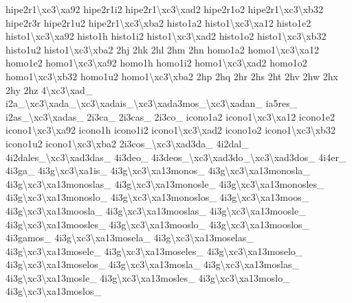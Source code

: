 {hipe2r1\textbackslash{}xc3\textbackslash{}xa92 hipe2r1i2 hipe2r1\textbackslash{}xc3\textbackslash{}xad2 hipe2r1o2 hipe2r1\textbackslash{}xc3\textbackslash{}xb32 hipe2r3r hipe2r1u2 hipe2r1\textbackslash{}xc3\textbackslash{}xba2 histo1a2 histo1\textbackslash{}xc3\textbackslash{}xa12 histo1e2 histo1\textbackslash{}xc3\textbackslash{}xa92 histo1h histo1i2 histo1\textbackslash{}xc3\textbackslash{}xad2 histo1o2 histo1\textbackslash{}xc3\textbackslash{}xb32 histo1u2 histo1\textbackslash{}xc3\textbackslash{}xba2 2hj 2hk 2hl 2hm 2hn homo1a2 homo1\textbackslash{}xc3\textbackslash{}xa12 homo1e2 homo1\textbackslash{}xc3\textbackslash{}xa92 homo1h homo1i2 homo1\textbackslash{}xc3\textbackslash{}xad2 homo1o2 homo1\textbackslash{}xc3\textbackslash{}xb32 homo1u2 homo1\textbackslash{}xc3\textbackslash{}xba2 2hp 2hq 2hr 2hs 2ht 2hv 2hw 2hx 2hy 2hz 4\textbackslash{}xc3\textbackslash{}xad\-\_\- i2a\-\_\textbackslash{}xc3\textbackslash{}xada\-\_\textbackslash{}xc3\textbackslash{}xadais\-\_\textbackslash{}xc3\textbackslash{}xada3mos\-\_\textbackslash{}xc3\textbackslash{}xadan\-\_\- ia5res\-\_\- i2as\-\_\textbackslash{}xc3\textbackslash{}xadas\-\_\- 2i3ca\-\_\- 2i3cas\-\_\- 2i3co\-\_\- icono1a2 icono1\textbackslash{}xc3\textbackslash{}xa12 icono1e2 icono1\textbackslash{}xc3\textbackslash{}xa92 icono1h icono1i2 icono1\textbackslash{}xc3\textbackslash{}xad2 icono1o2 icono1\textbackslash{}xc3\textbackslash{}xb32 icono1u2 icono1\textbackslash{}xc3\textbackslash{}xba2 2i3cos\-\_\textbackslash{}xc3\textbackslash{}xad3da\-\_\- 4i2dal\-\_\- 4i2dales\-\_\textbackslash{}xc3\textbackslash{}xad3das\-\_\- 4i3deo\-\_\- 4i3deos\-\_\textbackslash{}xc3\textbackslash{}xad3do\-\_\textbackslash{}xc3\textbackslash{}xad3dos\-\_\- 4i4er\-\_\- 4i3ga\-\_\- 4i3g\textbackslash{}xc3\textbackslash{}xa1is\-\_\- 4i3g\textbackslash{}xc3\textbackslash{}xa13monos\-\_\- 4i3g\textbackslash{}xc3\textbackslash{}xa13monosla\-\_\- 4i3g\textbackslash{}xc3\textbackslash{}xa13monoslas\-\_\- 4i3g\textbackslash{}xc3\textbackslash{}xa13monosle\-\_\- 4i3g\textbackslash{}xc3\textbackslash{}xa13monosles\-\_\- 4i3g\textbackslash{}xc3\textbackslash{}xa13monoslo\-\_\- 4i3g\textbackslash{}xc3\textbackslash{}xa13monoslos\-\_\- 4i3g\textbackslash{}xc3\textbackslash{}xa13moos\-\_\- 4i3g\textbackslash{}xc3\textbackslash{}xa13moosla\-\_\- 4i3g\textbackslash{}xc3\textbackslash{}xa13mooslas\-\_\- 4i3g\textbackslash{}xc3\textbackslash{}xa13moosle\-\_\- 4i3g\textbackslash{}xc3\textbackslash{}xa13moosles\-\_\- 4i3g\textbackslash{}xc3\textbackslash{}xa13mooslo\-\_\- 4i3g\textbackslash{}xc3\textbackslash{}xa13mooslos\-\_\- 4i3gamos\-\_\- 4i3g\textbackslash{}xc3\textbackslash{}xa13mosela\-\_\- 4i3g\textbackslash{}xc3\textbackslash{}xa13moselas\-\_\- 4i3g\textbackslash{}xc3\textbackslash{}xa13mosele\-\_\- 4i3g\textbackslash{}xc3\textbackslash{}xa13moseles\-\_\- 4i3g\textbackslash{}xc3\textbackslash{}xa13moselo\-\_\- 4i3g\textbackslash{}xc3\textbackslash{}xa13moselos\-\_\- 4i3g\textbackslash{}xc3\textbackslash{}xa13mosla\-\_\- 4i3g\textbackslash{}xc3\textbackslash{}xa13moslas\-\_\- 4i3g\textbackslash{}xc3\textbackslash{}xa13mosle\-\_\- 4i3g\textbackslash{}xc3\textbackslash{}xa13mosles\-\_\- 4i3g\textbackslash{}xc3\textbackslash{}xa13moslo\-\_\- 4i3g\textbackslash{}xc3\textbackslash{}xa13moslos\-\_\- }
